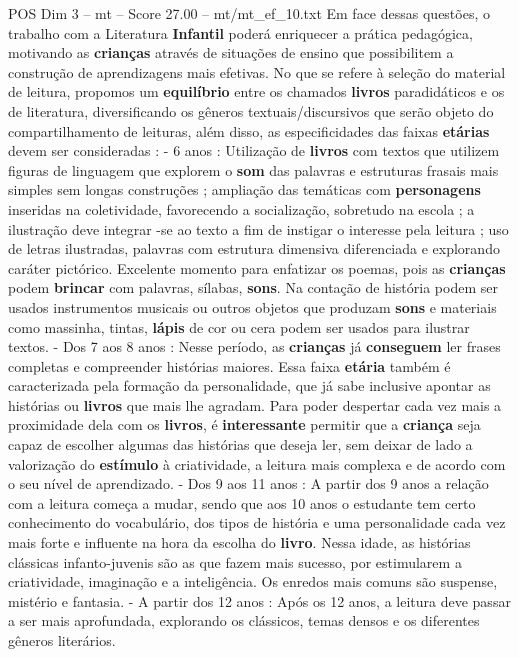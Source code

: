 \begin{textsample}{POS Dim 3 – mt – Score 27.00 – mt/mt\_ef\_10.txt}
Em face dessas questões, o trabalho com a Literatura \textbf{Infantil} poderá enriquecer a prática pedagógica, motivando as \textbf{crianças} através de situações de ensino que possibilitem a construção de aprendizagens mais efetivas.
No que se refere à seleção do material de leitura, propomos um \textbf{equilíbrio} entre os chamados \textbf{livros} paradidáticos e os de literatura, diversificando os gêneros textuais/discursivos que serão objeto do compartilhamento de leituras, além disso, as especificidades das faixas \textbf{etárias} devem ser consideradas : - 6 anos : Utilização de \textbf{livros} com textos que utilizem figuras de linguagem que explorem o \textbf{som} das palavras e estruturas frasais mais simples sem longas construções ; ampliação das temáticas com \textbf{personagens} inseridas na coletividade, favorecendo a socialização, sobretudo na escola ; a ilustração deve integrar -se ao texto a fim de instigar o interesse pela leitura ; uso de letras ilustradas, palavras com estrutura dimensiva diferenciada e explorando caráter pictórico.
Excelente momento para enfatizar os poemas, pois as \textbf{crianças} podem \textbf{brincar} com palavras, sílabas, \textbf{sons}.
Na contação de história podem ser usados instrumentos musicais ou outros objetos que produzam \textbf{sons} e materiais como massinha, tintas, \textbf{lápis} de cor ou cera podem ser usados para ilustrar textos. - Dos 7 aos 8 anos : Nesse período, as \textbf{crianças} já \textbf{conseguem} ler frases completas e compreender histórias maiores.
Essa faixa \textbf{etária} também é caracterizada pela formação da personalidade, que já sabe inclusive apontar as histórias ou \textbf{livros} que mais lhe agradam.
Para poder despertar cada vez mais a proximidade dela com os \textbf{livros}, é \textbf{interessante} permitir que a \textbf{criança} seja capaz de escolher algumas das histórias que deseja ler, sem deixar de lado a valorização do \textbf{estímulo} à criatividade, a leitura mais complexa e de acordo com o seu nível de aprendizado. - Dos 9 aos 11 anos : A partir dos 9 anos a relação com a leitura começa a mudar, sendo que aos 10 anos o estudante tem certo conhecimento do vocabulário, dos tipos de história e uma personalidade cada vez mais forte e influente na hora da escolha do \textbf{livro}.
Nessa idade, as histórias clássicas infanto-juvenis são as que fazem mais sucesso, por estimularem a criatividade, imaginação e a inteligência.
Os enredos mais comuns são suspense, mistério e fantasia. - A partir dos 12 anos : Após os 12 anos, a leitura deve passar a ser mais aprofundada, explorando os clássicos, temas densos e os diferentes gêneros literários.

\end{textsample}
